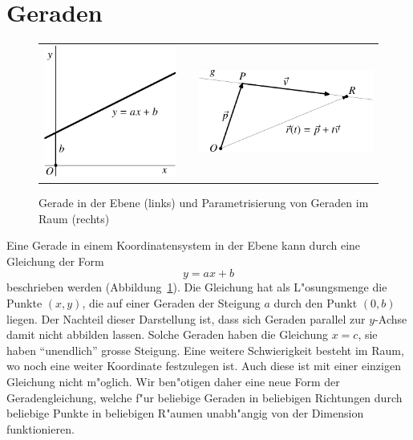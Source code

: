 \section{Geraden}
\begin{figure}
\begin{center}
\begin{tabular}{ccc}
\includegraphics{images/v-6}&%
\qquad\qquad\qquad&
\includegraphics{images/v-7}%
\end{tabular}
\end{center}
\caption{Gerade in der Ebene (links) und Parametrisierung von Geraden im
Raum (rechts) \label{image-gerade}}
\end{figure}
Eine Gerade in einem Koordinatensystem in der Ebene kann durch eine
Gleichung der Form
\[
y=ax+b
\]
beschrieben werden (Abbildung~\ref{image-gerade}).
Die Gleichung hat als L"osungsmenge die Punkte
$(x,y)$, die auf einer Geraden der Steigung $a$ durch den Punkt $(0,b)$
liegen.
Der Nachteil dieser Darstellung ist, dass sich Geraden parallel zur $y$-Achse
damit nicht abbilden lassen. Solche Geraden haben die Gleichung $x=c$, sie haben
``unendlich'' grosse Steigung.
Eine weitere Schwierigkeit besteht im Raum, wo noch eine weiter Koordinate
festzulegen ist. Auch diese ist mit einer einzigen Gleichung nicht m"oglich.
Wir ben"otigen daher eine neue Form der Geradengleichung, welche f"ur beliebige
Geraden in beliebigen Richtungen durch beliebige Punkte in beliebigen R"aumen
unabh"angig von der Dimension funktionieren.

